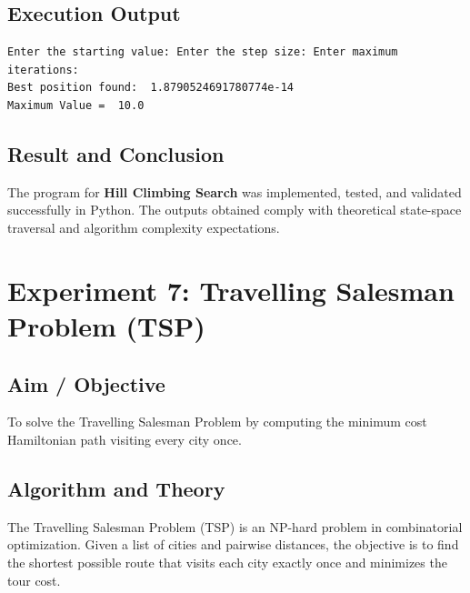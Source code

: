 \documentclass[11pt,a4paper]{report}
\begin{document}
\section{Execution Output}
\begin{tcolorbox}[colback=outputback,colframe=outputframe,title={\textbf{Terminal Output - Hill Climbing Search}}]
\begin{verbatim}
Enter the starting value: Enter the step size: Enter maximum iterations: 
Best position found:  1.8790524691780774e-14
Maximum Value =  10.0
\end{verbatim}
\end{tcolorbox}

\section{Result and Conclusion}
The program for \textbf{Hill Climbing Search} was implemented, tested, and validated successfully in Python. The outputs obtained comply with theoretical state-space traversal and algorithm complexity expectations.

\newpage

\chapter{Experiment 7: Travelling Salesman Problem (TSP)}

\section{Aim / Objective}
To solve the Travelling Salesman Problem by computing the minimum cost Hamiltonian path visiting every city once.

\section{Algorithm and Theory}
The Travelling Salesman Problem (TSP) is an NP-hard problem in combinatorial optimization. Given a list of cities and pairwise distances, the objective is to find the shortest possible route that visits each city exactly once and minimizes the tour cost.
\end{document}
